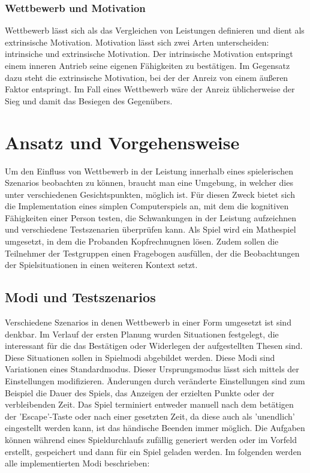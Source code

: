 \subsection{Wettbewerb und Motivation}
Wettbewerb lässt sich als das Vergleichen von Leistungen definieren und dient als extrinsische Motivation. Motivation lässt sich zwei Arten unterscheiden: intrinsiche und extrinsische Motivation.%
Der intrinsische Motivation entspringt einem inneren Antrieb seine eigenen Fähigkeiten zu bestätigen.%
Im Gegensatz dazu steht die extrinsische Motivation, bei der der Anreiz von einem äußeren Faktor entspringt. Im Fall eines Wettbewerb wäre der Anreiz üblicherweise der Sieg und damit das Besiegen des Gegenübers.\cite{Deci1981}

\chapter{Ansatz und Vorgehensweise}
 Um den Einfluss von Wettbewerb in der Leistung innerhalb eines spielerischen Szenarios beobachten zu können, braucht man eine Umgebung, in welcher dies unter verschiedenen Gesichtspunkten, möglich ist. Für diesen Zweck bietet sich die Implementation eines simplen Computerspiels an, mit dem die kognitiven Fähigkeiten einer Person testen, die Schwankungen in der Leistung aufzeichnen und verschiedene Testszenarien überprüfen kann. Als Spiel wird ein Mathespiel umgesetzt, in dem die Probanden Kopfrechnugnen lösen. Zudem sollen die Teilnehmer der Testgruppen einen Fragebogen ausfüllen, der die Beobachtungen der Spielsituationen in einen weiteren Kontext setzt.
 
\section{Modi und Testszenarios}
Verschiedene Szenarios in denen Wettbewerb in einer Form umgesetzt ist sind denkbar. Im Verlauf der ersten Planung  wurden Situationen festgelegt, die interessant für die das Bestätigen oder Widerlegen der aufgestellten Thesen sind. Diese Situationen sollen in Spielmodi abgebildet werden.\newline
Diese Modi sind Variationen eines Standardmodus. Dieser Ursprungsmodus lässt sich mittels der Einstellungen modifizieren. Änderungen durch veränderte Einstellungen sind zum Beispiel die Dauer des Spiels, das Anzeigen der erzielten Punkte oder der verbleibenden Zeit. Das Spiel terminiert entweder manuell nach dem betätigen der 'Escape'-Taste oder nach einer gesetzten Zeit, da diese auch als 'unendlich' eingestellt werden kann, ist das händische Beenden immer möglich. Die Aufgaben können während eines Spieldurchlaufs zufällig generiert werden oder im Vorfeld erstellt, gespeichert und dann für ein Spiel geladen werden. Im folgenden werden alle implementierten Modi beschrieben:\itemize

